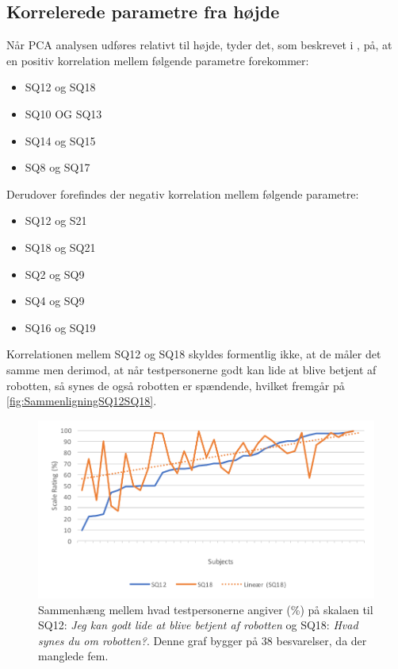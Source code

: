 \subsection{Korrelerede parametre fra højde}
\label{DatabehandlingSammenligningKorreleredeHoejde}
%
Når PCA analysen udføres relativt til højde, tyder det, som beskrevet i , på, at en positiv korrelation mellem følgende parametre forekommer:
%
\begin{itemize}
	\item SQ12 og SQ18
	\item SQ10 OG SQ13 
	\item SQ14 og SQ15
	\item SQ8 og SQ17\blankline
\end{itemize}
\noindent
%
Derudover forefindes der negativ korrelation mellem følgende parametre:
%
\begin{itemize}
	\item SQ12 og S21
	\item SQ18 og SQ21
	\item SQ2 og SQ9
	\item SQ4 og SQ9
	\item SQ16 og SQ19\blankline
\end{itemize}
\noindent
%
Korrelationen mellem SQ12 og SQ18 skyldes formentlig ikke, at de måler det samme men derimod, at når testpersonerne godt kan lide at blive betjent af robotten, så synes de også robotten er spændende, hvilket fremgår på \autoref{fig:SammenligningSQ12SQ18}. 
%
\begin{figure}[H]
	\centering
	\includegraphics[width=\textwidth]{Figure/Korrelationsgrafer/SQ12+SQ18}
	\caption{Sammenhæng mellem hvad testpersonerne angiver (\%) på skalaen til SQ12: \textit{Jeg kan godt lide at blive betjent af robotten} og SQ18: \textit{Hvad synes du om robotten?}. Denne graf bygger på 38 besvarelser, da der manglede fem.}
	\label{fig:SammenligningSQ12SQ18}
\end{figure}
